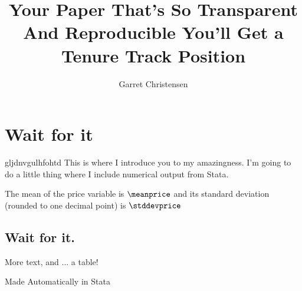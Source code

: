 \documentclass[11pt]{article} %
\title{Your Paper That's So Transparent And Reproducible You'll Get a Tenure Track Position}
\author{Garret Christensen}
\begin{document}

\maketitle

\section{Wait for it}
gljdnvgulhfohtd
This is where I introduce you to my amazingness.
I'm going to do a little thing where I include numerical output from Stata.

The mean of the price variable is $\meanprice$ and its standard deviation (rounded to one decimal point) is $\stddevprice$

\subsection{Wait for it.}

More text, and ... a table! 

\begin{table}
\caption{Made Automatically in Stata}
\end{table}

\end{document}
